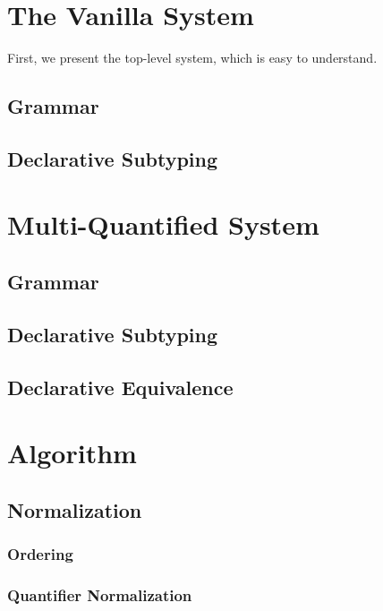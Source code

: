 \documentclass[a4,natbib=false]{article}
\begin{document}
\section{The Vanilla System}

First, we present the top-level system, which is easy to understand.

\subsection{Grammar}
\ottgrammartabular{
  \ottP\ottinterrule
  \ottN\ottinterrule
}

\subsection{Declarative Subtyping}
\ottdefnsDZero

\section{Multi-Quantified System}
\subsection{Grammar}
\ottgrammartabular{
  \ottiP\ottinterrule
  \ottiN\ottinterrule
}
\subsection{Declarative Subtyping}
\ottdefnsDOne


\subsection{Declarative Equivalence}
\ottdefnsEOne


\section{Algorithm}

\subsection{Normalization}
\subsubsection{Ordering}
\ottdefnsOrder

\subsubsection{Quantifier Normalization}
\ottdefnsNrm
\end{document}
